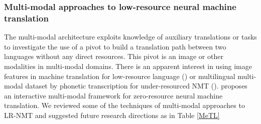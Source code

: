 \documentclass[manuscript,screen]{acmart}
\begin{document}
\subsubsection{\bf{Multi-modal approaches to low-resource neural machine translation}}
The multi-modal architecture exploits knowledge of auxiliary translations or tasks to investigate the use of a pivot to build a translation path between two languages without any direct resources. This pivot is an image or other modalities in multi-modal domains. There is an apparent interest in using image features in machine translation for low-resource language (\citet{chowdhury2018multimodal}) or multilingual multi-modal dataset by phonetic transcription for under-resourced NMT (\citet{chakravarthi2019multilingual}). \citet{chen2018zero} proposes an interactive multi-modal framework for zero-resource neural machine translation. We reviewed some of the techniques of multi-modal approaches to LR-NMT and suggested future research directions as in Table \ref{MeTL}
\end{document}

